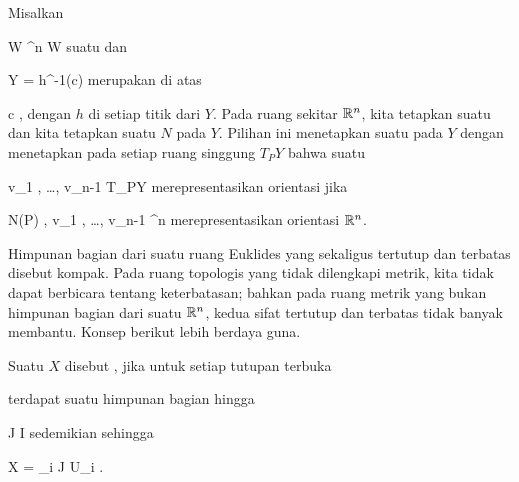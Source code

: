 {}
{

Misalkan

\mavergleichskette
{\vergleichskette
{ W
}
{ \subseteq }{ \R^n
}
{  }{
}
{    }{
}
{   }{
}
}
{}{}{}
 { W } { \R
} {}
suatu
dan

\mavergleichskette
{\vergleichskette
{ Y
}
{ = }{ h^{-1}(c)
}
{  }{
}
{    }{
}
{   }{
}
}
{}{}{}
merupakan
di atas

\mavergleichskette
{\vergleichskette
{ c
}
{ \in }{ \R
}
{  }{
}
{    }{
}
{   }{
}
}
{}{}{,}
dengan $h$
di setiap titik dari $Y$. Pada ruang sekitar ${\mathbb R}^n$, kita tetapkan suatu
 {} {}
dan kita tetapkan suatu
$N$ pada $Y$. Pilihan ini menetapkan suatu
pada $Y$
 {} {}
dengan menetapkan pada setiap ruang singgung $T_PY$ bahwa suatu

\mavergleichskette
{\vergleichskette
{ v_1 , \ldots , v_{n-1}
}
{ \in }{ T_PY
}
{  }{
}
{    }{
}
{   }{
}
}
{}{}{}
merepresentasikan orientasi jika

\mavergleichskette
{\vergleichskette
{ N(P) , v_1 , \ldots , v_{n-1}
}
{ \in }{ \R^n
}
{  }{
}
{    }{
}
{   }{
}
}
{}{}{}
merepresentasikan orientasi ${\mathbb R}^n$.

}


Himpunan bagian dari suatu ruang Euklides yang sekaligus tertutup dan terbatas disebut kompak. Pada ruang topologis yang tidak dilengkapi metrik, kita tidak dapat berbicara tentang keterbatasan; bahkan pada ruang metrik yang bukan himpunan bagian dari suatu ${\mathbb R}^n$, kedua sifat tertutup dan terbatas tidak banyak membantu. Konsep berikut lebih berdaya guna.

{}
{

Suatu
$X$ disebut 
 {} {,}
jika untuk setiap tutupan terbuka

 {  }

terdapat suatu himpunan bagian hingga

\mavergleichskette
{\vergleichskette
{J
}
{ \subseteq }{ I
}
{  }{
}
{    }{
}
{   }{
}
}
{}{}{}
sedemikian sehingga

\mavergleichskettedisp
{\vergleichskette
{ X
}
{ =} { \bigcup_{i \in J} U_i
}
{ } {
}
{ } {
}
{ } {
}
}
{}{}{}
.

}

